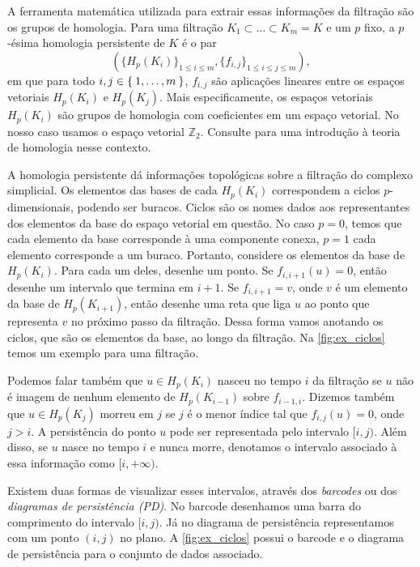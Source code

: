 A ferramenta matemática utilizada para extrair essas informações da filtração
são os grupos de homologia. Para uma filtração $K_1 \subset \dots \subset K_m=K$ e um
$p$ fixo, a $p$-ésima homologia persistente de $K$ é o par
\begin{equation}
  \label{eq:seq_hom}
  \left( \{H_p(K_i)\}_{1\leq i \leq m}, \{f_{i,j}\}_{1\leq i \leq j \leq m} \right),
\end{equation}
em que para todo $i,j \in \Set{1,\dots,m}$, $f_{i,j}$ são aplicações lineares
entre os espaços vetoriais $H_p(K_i)$ e $H_p(K_j)$. Mais especificamente,
os espaços vetoriais $H_p(K_i)$ são grupos de homologia com coeficientes
em um espaço vetorial. No nosso caso usamos o espaço vetorial $\mathbb{Z}_2$.
Consulte \cite{edelsbrunner2010computational} para uma introdução à teoria de homologia nesse contexto.

A homologia persistente dá informações topológicas sobre a filtração do complexo simplicial.
Os elementos das bases de cada $H_p(K_i)$ correspondem a ciclos $p$-dimensionais,
podendo ser buracos. Ciclos são os nomes dados aos representantes dos elementos da base
do espaço vetorial em questão. No caso $p=0$, temos que cada elemento da base corresponde
à uma componente conexa, $p=1$ cada elemento corresponde a um buraco.
Portanto, considere os elementos da base de $H_p(K_i)$. Para cada um deles,
desenhe um ponto. Se $f_{i,i+1}(u)=0$, então desenhe um intervalo que termina
em $i+1$. Se $f_{i,i+1}=v$, onde $v$ é um elemento da base de $H_p(K_{i+1})$,
então desenhe uma reta que liga $u$ ao ponto que representa $v$ no próximo passo
da filtração. Dessa forma vamos anotando os ciclos, que são os elementos da base,
ao longo da filtração. Na \autoref{fig:ex_ciclos} temos um exemplo para uma filtração.

Podemos falar também que $u\in H_p(K_i)$ nasceu no tempo $i$ da filtração se
$u$ não é imagem de nenhum elemento de $H_p(K_{i-1})$ sobre $f_{i-1,i}$.
Dizemos também que $u \in H_p(K_j)$ morreu em $j$ se $j$ é o menor índice tal que
$f_{i,j}(u) = 0$, onde $j>i$. A persistência do ponto $u$ pode ser representada pelo intervalo
$[i,j)$. Além disso, se $u$ nasce no tempo $i$ e nunca morre, denotamos o intervalo
associado à essa informação como $[i, +\infty)$.

Existem duas formas de visualizar esses intervalos, através dos
\textit{barcodes} ou dos \textit{diagramas de persistência (PD)}. No barcode
desenhamos uma barra do comprimento do intervalo $[i,j)$. Já no diagrama de
persistência representamos com um ponto $(i,j)$ no plano. A \autoref{fig:ex_ciclos}
possui o barcode e o diagrama de persistência para o conjunto de dados associado.


